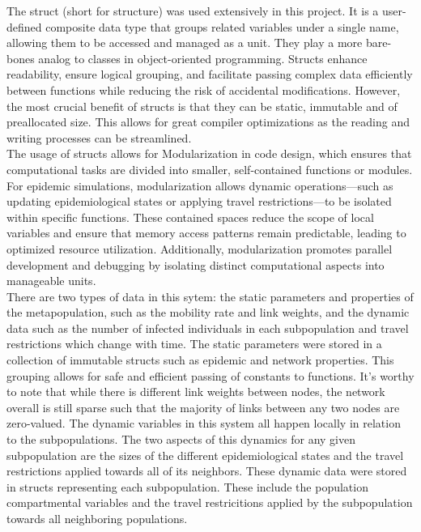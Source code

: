 The struct (short for structure) was used extensively in this project. It is a user-defined composite data type that groups related variables under a single name, allowing them to be accessed and managed as a unit. They play a more bare-bones analog to classes in object-oriented programming. Structs enhance readability, ensure logical grouping, and facilitate passing complex data efficiently between functions while reducing the risk of accidental modifications. However, the most crucial benefit of structs is that they can be static, immutable and of preallocated size. This allows for great compiler optimizations as the reading and writing processes can be streamlined.\\

The usage of structs allows for Modularization in code design, which ensures that computational tasks are divided into smaller, self-contained functions or modules. For epidemic simulations, modularization allows dynamic operations—such as updating epidemiological states or applying travel restrictions—to be isolated within specific functions. These contained spaces reduce the scope of local variables and ensure that memory access patterns remain predictable, leading to optimized resource utilization. Additionally, modularization promotes parallel development and debugging by isolating distinct computational aspects into manageable units.\\

There are two types of data in this sytem: the static parameters and properties of the metapopulation, such as the mobility rate and link weights, and the dynamic data such as the number of infected individuals in each subpopulation and travel restrictions which change with time. The static parameters were stored in a collection of immutable structs such as epidemic and network properties. This grouping allows for safe and efficient passing of constants to functions. It's worthy to note that while there is different link weights between nodes, the network overall is still sparse such that the majority of links between any two nodes are zero-valued. The dynamic variables in this system all happen locally in relation to the subpopulations. The two aspects of this dynamics for any given subpopulation are the sizes of the different epidemiological states and the travel restrictions applied towards all of its neighbors. These dynamic data were stored in structs representing each subpopulation. These include the population compartmental variables and the travel restricitions applied by the subpopulation towards all neighboring populations.\\

